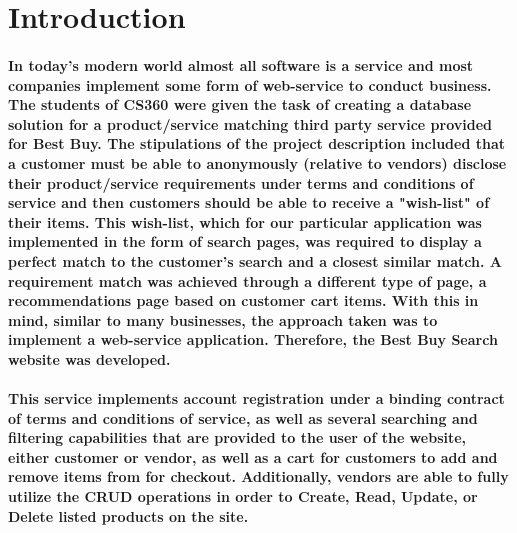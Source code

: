 \documentclass[sigconf]{acmart}
\begin{document}



\maketitle


\section{Introduction}

\paragraph{In today's modern world almost all software is a service and most companies implement some form of web-service to conduct business. The students of CS360 were given the task of creating a database solution for a product/service matching third party service provided for Best Buy. The stipulations of the project description included that a customer must be able to anonymously (relative to vendors) disclose their product/service requirements under terms and conditions of service and then customers should be able to receive a "wish-list" of their items. This wish-list, which for our particular application was implemented in the form of search pages, was required to display a perfect match to the customer's search and a closest similar match. A requirement match was achieved through a different type of page, a recommendations page based on customer cart items. With this in mind, similar to many businesses, the approach taken was to implement a web-service application. Therefore, the Best Buy Search website was developed.}

\paragraph{This service implements account registration under a binding contract of terms and conditions of service, as well as several searching and filtering capabilities that are provided to the user of the website, either customer or vendor, as well as a cart for customers to add and remove items from for checkout. Additionally, vendors are able to fully utilize the CRUD operations in order to Create, Read, Update, or Delete listed products on the site.}
\end{document}
